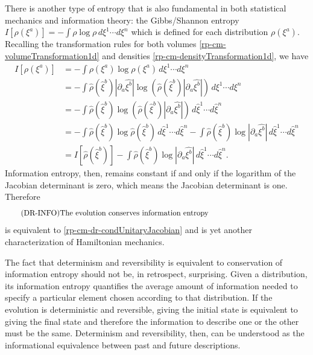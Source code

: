 There is another type of entropy that is also fundamental in both statistical mechanics and information theory: the Gibbs/Shannon entropy $I[\rho(\xi^a)]=-\int \rho \log \rho \, d\xi^1 \cdots d\xi^n$ which is defined for each distribution $\rho(\xi^a)$. Recalling the transformation rules for both volumes \ref{rp-cm-volumeTransformation1d} and densities \ref{rp-cm-densityTransformation1d}, we have
\begin{equation}
	\begin{aligned}
	I[\rho(\xi^a)] &= - \int \rho(\xi^a) \log \rho(\xi^a) \, d\xi^1 \cdots d\xi^n \\
&= - \int  \hat{\rho}(\hat{\xi}^b) \left| \partial_a \hat{\xi^b} \right| \log \left( \hat{\rho}(\hat{\xi}^b) \left| \partial_a \hat{\xi^b} \right| \right) \, d\xi^1 \cdots d\xi^n \\
&= - \int \hat{\rho}(\hat{\xi}^b) \log \left( \hat{\rho}(\hat{\xi}^b) \left| \partial_a \hat{\xi^b} \right| \right) \, d\hat{\xi}^1 \cdots d\hat{\xi}^n \\
&= - \int \hat{\rho}(\hat{\xi}^b) \log \hat{\rho}(\hat{\xi}^b) \, d\hat{\xi}^1 \cdots d\hat{\xi}^n - \int \hat{\rho}(\hat{\xi}^b) \log \left| \partial_a \hat{\xi^b} \right| \, d\hat{\xi}^1 \cdots d\hat{\xi}^n \\
&= I[\hat{\rho}(\hat{\xi}^b)] - \int \hat{\rho}(\hat{\xi}^b) \log \left| \partial_a \hat{\xi^b} \right| \, d\hat{\xi}^1 \cdots d\hat{\xi}^n.
	\end{aligned}
\end{equation}
Information entropy, then, remains constant if and only if the logarithm of the Jacobian determinant is zero, which means the Jacobian determinant is one. Therefore
\begin{equation}\label{rp-cm-dr-condInformation}
	\tag{DR-INFO}
	\eqtext{The evolution conserves information entropy}	
\end{equation}
is equivalent to \ref{rp-cm-dr-condUnitaryJacobian} and is yet another characterization of Hamiltonian mechanics.

The fact that determinism and reversibility is equivalent to conservation of information entropy should not be, in retrospect, surprising. Given a distribution, its information entropy quantifies the average amount of information needed to specify a particular element chosen according to that distribution. If the evolution is deterministic and reversible, giving the initial state is equivalent to giving the final state and therefore the information to describe one or the other must be the same. Determinism and reversibility, then, can be understood as the informational equivalence between past and future descriptions.

